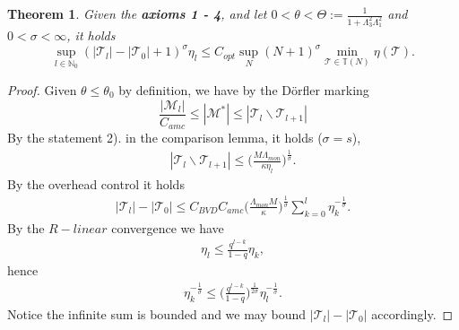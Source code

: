 \documentclass[a4paper,12pt,oneside,fleqn]{book}
\newtheorem{theorem}{Theorem}[section]
\theoremstyle{definition}
\theoremstyle{remark}
\begin{document}
\begin{theorem}
Given the \textbf{axioms 1 - 4}, and let $0 < \theta < \Theta:= \frac{1}{1 + \Lambda_3^2 \Lambda_1^2}$ and $0 < \sigma < \infty$, it holds
\begin{equation}
	\sup_{l \in \mathbb{N}_0}( |\mathcal{T}_l| - |\mathcal{T}_0| + 1)^\sigma \eta_l \le C_{opt} \sup_{N} (N + 1)^\sigma \min_{\mathcal{T} \in \mathbb{T}(N)} \eta(\mathcal{T}). 
\end{equation}
\end{theorem}
\begin{proof}
Given $\theta \le \theta_0 $ by definition, we have by the D\"orfler marking 
\begin{equation*}
	\frac{|\mathcal{M}_l|}{C_{amc}} \le |\mathcal{M}^*| \le |\mathcal{T}_{l}\backslash \mathcal{T}_{l + 1}|
\end{equation*}
By the statement 2). in the comparison lemma, it holds ($\sigma = s$), 
\begin{align*}
	|\mathcal{T}_l \backslash \mathcal{T}_{l + 1}| \le \bigg(\frac{M \Lambda_{mon}}{\kappa \eta_l}\bigg)^{\frac{1}{\sigma}} .
\end{align*}
By the overhead control it holds
\begin{align*}
	|\mathcal{T}_l| - |\mathcal{T}_0| \le C_{BVD}C_{amc} \bigg(\frac{\Lambda_{mon} M}{\kappa} \bigg)^{\frac{1}{\sigma}} \sum_{k = 0}^l \eta_k^{-\frac{1}{\sigma}}.
\end{align*}
By the $R-linear$ convergence we have
\begin{align*}
	\eta_l \le \frac{q^{l - k}}{1 - q} \eta_k,
\end{align*}
hence
\begin{align*}
	\eta_k^{-\frac{1}{\sigma}} \le \bigg(\frac{q^{l-k}}{1 - q}\bigg)^{\frac{1}{2\sigma}}\eta_l^{-\frac{1}{\sigma}}.
\end{align*}
Notice the infinite sum is bounded and we may bound $|\mathcal{T}_l| - |\mathcal{T}_0|$ accordingly. 
\end{proof}
\end{document}
